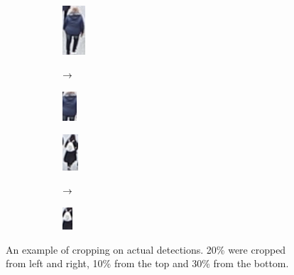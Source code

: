 \begin{figure}
    \centering
     \hfill
     \begin{subfigure}[t]{0.28\textwidth} %
        \centering
        \begin{subfigure}[c]{0.3\textwidth}
          \centering
          \includegraphics[]{img/background_filter/1_original.png}
        \end{subfigure}
        \hfill
        \begin{subfigure}[c]{0.3\textwidth}
          \centering
          $\rightarrow$
        \end{subfigure}
        \hfill
        \begin{subfigure}[c]{0.3\textwidth}
          \centering
          \includegraphics[]{img/background_filter/1_small.png}
        \end{subfigure}
     \end{subfigure}
     \hfill
     \begin{subfigure}[t]{0.28\textwidth} %
        \centering
        \begin{subfigure}[c]{0.3\textwidth}
          \centering
          \includegraphics[]{img/background_filter/2_original.png}
        \end{subfigure}
        \hfill
        \begin{subfigure}[c]{0.3\textwidth}
          \centering
          $\rightarrow$
        \end{subfigure}
        \hfill
        \begin{subfigure}[c]{0.3\textwidth}
          \centering
          \includegraphics[]{img/background_filter/2_small.png}
        \end{subfigure}
     \end{subfigure}
     \hfill \hspace{0.1mm}

    \caption[An example of cropping on actual detections]{An example of cropping on actual detections. 20\% were cropped from left and right, 10\% from the top and 30\% from the bottom.}
    \label{fig:crop_example}
\end{figure}

